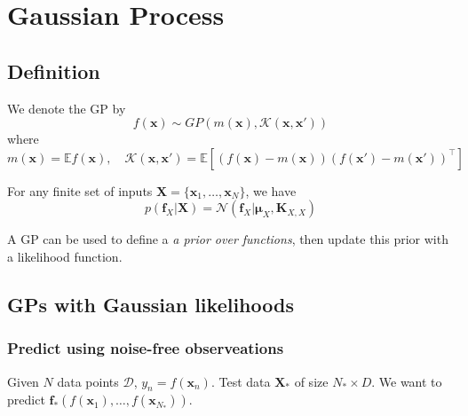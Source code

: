 \documentclass[../main.tex]{subfiles}
\begin{document}
\chapter{Gaussian Process}

\section{Definition}


We denote the GP  by 
\[
f(\boldsymbol{x}) \sim  GP(m(\boldsymbol{x}), \mathcal{K}(\boldsymbol{x}, \boldsymbol{x}'))
\]
where
\[
m(\boldsymbol{x}) = \mathbb{E}f(\boldsymbol{x}),  \quad \mathcal{K}(\boldsymbol{x}, \boldsymbol{x}') = \mathbb{E} \left[ (f(\boldsymbol{x}) - m(\boldsymbol{x}))(f(\boldsymbol{x}') - m(\boldsymbol{x}'))^{\top} \right] 
\]

For any finite set of inputs $\boldsymbol{X} = \{ \boldsymbol{x}_{1}, \ldots , \boldsymbol{x}_{N} \}$, we have
\[
p(\boldsymbol{f}_{X} | \boldsymbol{X}) = \mathcal{N}(\boldsymbol{f}_{X} | \boldsymbol{\mu}_{X}, \boldsymbol{K}_{X, X})
\]

A GP can be used to define a \emph{a prior over functions}, then update this prior with a likelihood function.


\section{GPs with Gaussian likelihoods}

\subsection{Predict using noise-free observeations}

Given $N$ data points $\mathcal{D}$, $y_{n} = f(\boldsymbol{x}_{n})$. Test data $\boldsymbol{X}_{*}$ of size $N_{*} \times  D$. We want to predict $\boldsymbol{f}_{*}(f(\boldsymbol{x}_{1}), \ldots , f(\boldsymbol{x}_{N_{*}}))$.
\end{document}
